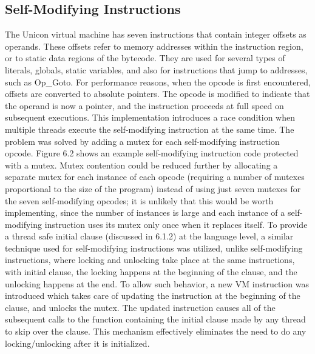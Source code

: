 \subsection{Self-Modifying Instructions}
The Unicon virtual machine has seven instructions that contain integer offsets as operands.
These offsets refer to memory addresses within the instruction region, or to static data
regions of the bytecode. They are used for several types of literals, globals,  static variables,
and also for instructions that jump to addresses, such as Op\_Goto. For performance reasons,
when the opcode is first encountered, offsets are converted to absolute pointers.
The opcode is modified to indicate that the operand is now a pointer, and the instruction
proceeds at full speed on subsequent executions.
This implementation introduces a race condition when multiple threads execute the self-modifying
instruction at the same time. The problem was solved by adding a mutex for each self-modifying
instruction opcode. Figure 6.2 shows an example self-modifying instruction code protected with
a mutex. Mutex contention could be reduced further by allocating a separate mutex for each instance
of each opcode (requiring a number of mutexes proportional to the size of the program)
instead of using just seven mutexes for the seven self-modifying opcodes; it is unlikely
that this would be worth implementing, since the number of instances is large and each
instance of a self-modifying instruction uses its mutex only once when it replaces itself. 
To provide a thread safe initial clause (discussed in 6.1.2) at the language level, a similar
technique used for self-modifying instructions was utilized, unlike self-modifying instructions,
where locking and unlocking take place at the same instructions, with initial clause, the locking
happens at the beginning of the clause, and the unlocking happens at the end. To allow such behavior,
a new VM instruction was introduced which takes care of updating the instruction at the beginning
of the clause, and unlocks the mutex. The updated instruction causes all of the subsequent calls to
the function containing the initial clause made by any thread to skip over the clause.
This mechanism effectively eliminates the need to do any locking/unlocking after it is initialized.


